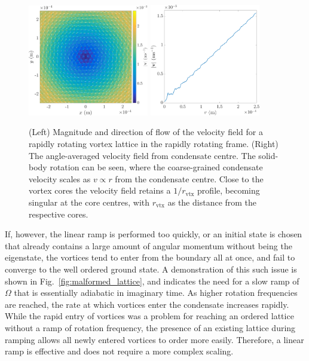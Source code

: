 \begin{figure}\centering
    \includegraphics[width=0.47\textwidth,clip,trim={0cm 0cm 0 0cm}]{Images/ch4_vtx/solidbody_v}
    \includegraphics[width=0.43\textwidth,clip,trim={0cm 0cm 0 0cm}]{Images/ch4_vtx/solidbody_vel_r}
    \caption{(Left) Magnitude and direction of flow of the velocity field for a rapidly rotating vortex lattice in the rapidly rotating frame. (Right) The angle-averaged velocity field from condensate centre. The solid-body rotation can be seen, where the coarse-grained condensate velocity scales as $v \propto r$ from the condensate centre. Close to the vortex cores the velocity field retains a $1/r_{\textrm{vtx}}$ profile, becoming singular at the core centres, with $r_{\textrm{vtx}}$ as the distance from the respective cores.}
    \label{fig:solidbody}
\end{figure}

If, however, the linear ramp is performed too quickly, or an initial state is chosen that already contains a large amount of angular momentum without being the eigenstate, the vortices tend to enter from the boundary all at once, and fail to converge to the well ordered ground state. A demonstration of this such issue is shown in Fig.~\ref{fig:malformed_lattice}, and indicates the need for a slow ramp of $\Omega$ that is essentially adiabatic in imaginary time. As higher rotation frequencies are reached, the rate at which vortices enter the condensate increases rapidly. While the rapid entry of vortices was a problem for reaching an ordered lattice without a ramp of rotation frequency, the presence of an existing lattice during ramping allows all newly entered vortices to order more easily. Therefore, a linear ramp is effective and does not require a more complex scaling.

